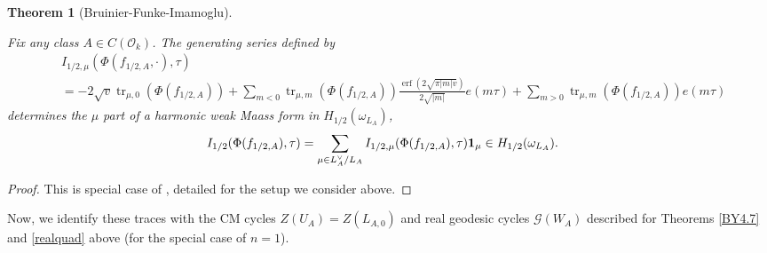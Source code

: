 \documentclass{amsart}
\newtheorem{theorem}{Theorem}[section]
\theoremstyle{definition}
\theoremstyle{definition}
\theoremstyle{definition}
\begin{document}
\begin{theorem}[Bruinier-Funke-Imamoglu]\label{BFI} 

Fix any class $A \in C(\mathcal{O}_k)$. The generating series defined by 
\begin{equation*}\begin{aligned} &I_{1/2, \mu}(\Phi(f_{1/2, A}, \cdot), \tau) \\
&= -2 \sqrt{v} \operatorname{tr}_{\mu, 0}(\Phi(f_{1/2, A})) 
+ \sum\limits_{m<0} \operatorname{tr}_{\mu, m}(\Phi(f_{1/2, A})) 
\frac{ \operatorname{erf} (2 \sqrt{\pi \vert m \vert v}) }{2 \sqrt{\vert m \vert}} e(m \tau) 
+ \sum\limits_{m>0} \operatorname{tr}_{\mu, m}(\Phi(f_{1/2, A})) e(m \tau) \end{aligned}\end{equation*}
determines the $\mu$ part of a harmonic weak Maass form in $H_{1/2}(\omega_{L_A})$,
\begin{align*} I_{1/2}(\Phi(f_{1/2, A}), \tau) 
&= \sum\limits_{\mu \in L_A^{\vee}/L_A} I_{1/2, \mu}(\Phi(f_{1/2, A}), \tau) {\bf{1}}_{\mu}  \in H_{1/2}(\omega_{L_A}). \end{align*}

\end{theorem}

\begin{proof} This is special case of \cite[Theorem 4.1]{BFI}, detailed for the setup we consider above. \end{proof}

Now, we identify these traces with the CM cycles $Z(U_A) = Z(L_{A,0})$ and real geodesic cycles $\mathcal{G}(W_A)$ described for
Theorems \ref{BY4.7} and \ref{realquad} above (for the special case of $n=1$).
\end{document}
